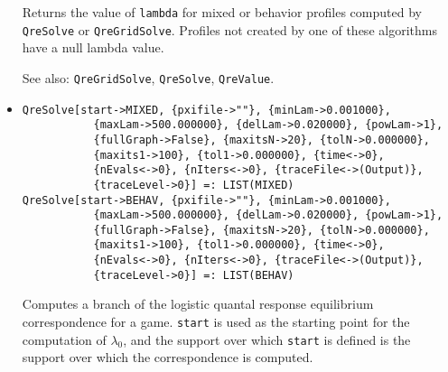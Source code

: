 \begin{itemize}
\bd
Returns the value of \verb+lambda+ for mixed or behavior profiles
computed by \verb+QreSolve+ or \verb+QreGridSolve+.  Profiles not
created by one of these algorithms have a null lambda value.
\item
[See also:] \verb+QreGridSolve+, \verb+QreSolve+, \verb+QreValue+.
\ed

\item{}
\protect \large \begin{verbatim}
QreSolve[start->MIXED, {pxifile->""}, {minLam->0.001000}, 
           {maxLam->500.000000}, {delLam->0.020000}, {powLam->1}, 
           {fullGraph->False}, {maxitsN->20}, {tolN->0.000000}, 
           {maxits1->100}, {tol1->0.000000}, {time<->0}, 
           {nEvals<->0}, {nIters<->0}, {traceFile<->(Output)}, 
           {traceLevel->0}] =: LIST(MIXED) 
QreSolve[start->BEHAV, {pxifile->""}, {minLam->0.001000}, 
           {maxLam->500.000000}, {delLam->0.020000}, {powLam->1}, 
           {fullGraph->False}, {maxitsN->20}, {tolN->0.000000}, 
           {maxits1->100}, {tol1->0.000000}, {time<->0}, 
           {nEvals<->0}, {nIters<->0}, {traceFile<->(Output)}, 
           {traceLevel->0}] =: LIST(BEHAV) 
\end{verbatim}\normalsize

\bd 
Computes a branch of the logistic quantal response equilibrium
correspondence for a game. \verb+start+ is
used as the starting point for the computation of $\lambda_{0}$, and
the support over which \verb+start+ is defined is the support over
which the correspondence is computed.


\end{itemize}
